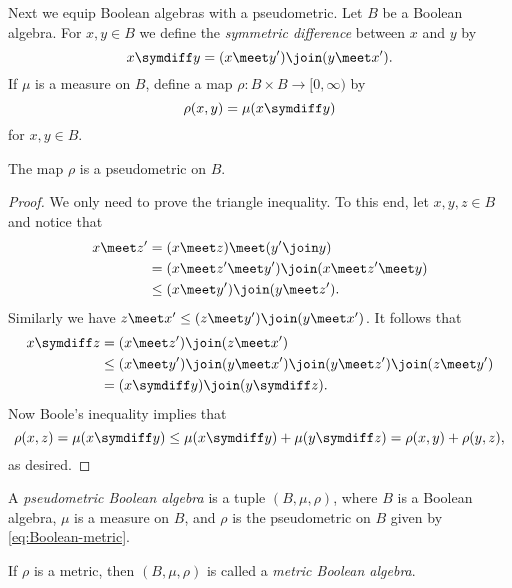 \documentclass[article, a4paper, 11pt, oneside]{memoir}
\numberwithin{equation}{chapter}
\begin{document}
Next we equip Boolean algebras with a pseudometric. Let $B$ be a Boolean algebra. For $x,y \in B$ we define the \emph{symmetric difference} between $x$ and $y$ by
%
\begin{equation*}
    x \symdiff y
        = (x \meet y') \join (y \meet x').
\end{equation*}
%
If $\mu$ is a measure on $B$, define a map $\rho \colon B \times B \to [0,\infty)$ by
%
\begin{equation}
    \label{eq:Boolean-metric}
    \rho(x,y)
        = \mu(x \symdiff y)
\end{equation}
%
for $x,y \in B$.


\begin{lemma}
    The map $\rho$ is a pseudometric on $B$.
\end{lemma}

\begin{proof}
    We only need to prove the triangle inequality. To this end, let $x,y,z \in B$ and notice that
    \begin{align*}
        x \meet z'
            &= (x \meet z) \meet (y' \join y) \\
            &= (x \meet z' \meet y') \join (x \meet z' \meet y) \\
            &\leq (x \meet y') \join (y \meet z').
    \end{align*}
    Similarly we have $z \meet x' \leq (z \meet y') \join (y \meet x')$. It follows that
    \begin{align*}
        x \symdiff z
            &= (x \meet z') \join (z \meet x') \\
            &\leq (x \meet y') \join (y \meet x') \join
                  (y \meet z') \join (z \meet y') \\
            &= (x \symdiff y) \join (y \symdiff z).
    \end{align*}
    Now Boole's inequality implies that
    \begin{equation*}
        \rho(x,z)
            = \mu(x \symdiff y)
            \leq \mu(x \symdiff y) + \mu(y \symdiff z)
            = \rho(x,y) + \rho(y,z),
    \end{equation*}
    as desired.
\end{proof}

\begin{definition}
    A \emph{pseudometric Boolean algebra} is a tuple $(B,\mu,\rho)$, where $B$ is a Boolean algebra, $\mu$ is a measure on $B$, and $\rho$ is the pseudometric on $B$ given by \eqref{eq:Boolean-metric}.

    If $\rho$ is a metric, then $(B,\mu,\rho)$ is called a \emph{metric Boolean algebra}.
\end{definition}
\end{document}
